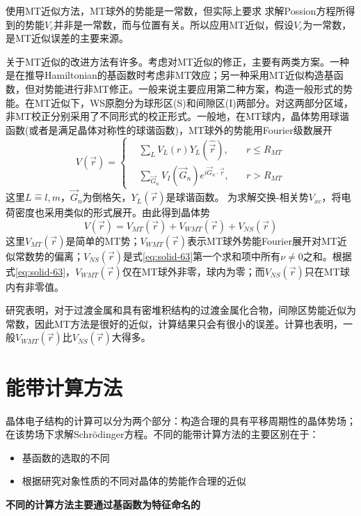 使用MT近似方法，MT球外的势能是一常数，但实际上要求%
求解Possion方程所得到的势能$V_c$并非是一常数，而与位置有关。所以应用MT近似，假设$V_c$为一常数，是MT近似误差的主要来源。

关于MT近似的改进方法有许多\cite{RPP44-139_1981}。考虑对MT近似的修正，主要有两类方案。一种是在推导Hamiltonian的基函数时考虑非MT效应；另一种采用MT近似构造基函数，但对势能进行非MT修正。一般来说主要应用第二种方案，构造一般形式的势能。在MT近似下，WS原胞分为球形区(S)和间隙区(I)两部分。对这两部分区域，非MT校正分别采用了不同形式的校正形式。一般地，在MT球内，晶体势用球谐函数(或者是满足晶体对称性的球谐函数)，MT球外的势能用Fourier级数展开\cite{PRB13-5362_1976}
\begin{equation}
  V(\vec r)=\left\{
  \begin{aligned}
    &\sum_LV_L(r)Y_L(\hat{\vec r}),\quad &r\leqslant R_{MT}\\
    &\sum_{\vec G_n}V_I(\vec G_n)e^{i\vec G_n\cdot\vec r},&r>R_{MT}
  \end{aligned}\right.
  \label{eq:solid-63}
\end{equation}
这里$L\hat=l,m$，$\vec G_n$为倒格矢，$Y_L(\vec r)$是球谐函数。%
为求解交换-相关势$V_{xc}$，将电荷密度也采用类似的形式展开。由此得到晶体势
\begin{equation}
  V(\vec r)=V_{MT}(\vec r)+V_{WMT}(\vec r)+V_{NS}(\vec r)
  \label{eq:solid-64}
\end{equation}
这里$V_{MT}(\vec r)$是简单的MT势；$V_{WMT}(\vec r)$表示MT球外势能Fourier展开对MT近似常数势的偏离；$V_{NS}(\vec r)$是式\eqref{eq:solid-63}第一个求和项中所有$\nu$$\neq$0之和。根据式\eqref{eq:solid-63}，$V_{WMT}(\vec r)$仅在MT球外非零，球内为零；而$V_{NS}(\vec r)$只在MT球内有非零值。

研究表明，对于过渡金属和具有密堆积结构的过渡金属化合物，间隙区势能近似为常数，因此MT方法是很好的近似，计算结果只会有很小的误差\cite{PR153-931_1967,PRB1-1318_1970,PLA33-414_1970}。计算也表明，一般$V_{WMT}(\vec r)$比$V_{NS}(\vec r)$大得多。

\section{能带计算方法}
晶体电子结构的计算可以分为两个部分：构造合理的具有平移周期性的晶体势场；在该势场下求解Schr\"odinger方程。不同的能带计算方法的主要区别在于：
\begin{itemize}
	\item 基函数的选取的不同
	\item 根据研究对象性质的不同对晶体的势能作合理的近似
\end{itemize}
\textbf{不同的计算方法主要通过基函数为特征命名的}
